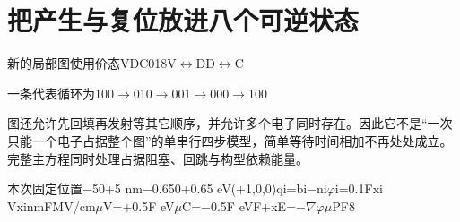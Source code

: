 \documentclass[11pt,a4paper]{article}
\begin{document}
\section{{\cjkfont 把产生与复位放进八个可逆状态}\allowbreak{}}\label{sec:43}
{\cjkfont 新的局部图使用价态}\allowbreak{}V\allowbreak{}D\allowbreak{}C\allowbreak{}0\allowbreak{}1\allowbreak{}8\allowbreak{}V\ensuremath{\leftrightarrow}D\allowbreak{}D\ensuremath{\leftrightarrow}C\allowbreak{}
\par
{\cjkfont 一条代表循环为}\allowbreak{}100\ensuremath{\to}010\ensuremath{\to}001\ensuremath{\to}000\ensuremath{\to}100\allowbreak{}
\par
{\cjkfont 图还允许先回填再发射等其它顺序，并允许多个电子同时存在。因此它不是“一次只能一个电子占据整个图”的单串行四步模型，简单等待时间相加不再处处成立。完整主方程同时处理占据阻塞、回跳与构型依赖能量。}\allowbreak{}
\par
{\cjkfont 本次固定位置}\allowbreak{}−5\allowbreak{}0\allowbreak{}+5 nm\allowbreak{}−0.65\allowbreak{}0\allowbreak{}+0.65 eV\allowbreak{}(+1,0,0)\allowbreak{}qi=\allowbreak{}bi−ni\allowbreak{}\ensuremath{\varphi}i=\allowbreak{}0.1Fxi V\allowbreak{}xi\allowbreak{}nm\allowbreak{}F\allowbreak{}MV/cm\allowbreak{}\ensuremath{\mu}V=\allowbreak{}+0.5F eV\allowbreak{}\ensuremath{\mu}C=\allowbreak{}−0.5F eV\allowbreak{}F\allowbreak{}+x\allowbreak{}E=\allowbreak{}−\ensuremath{\nabla}\ensuremath{\varphi}\allowbreak{}\ensuremath{\mu}\allowbreak{}PF\allowbreak{}8\allowbreak{}
\end{document}
